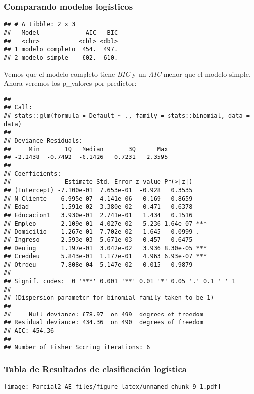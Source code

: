 \documentclass[
]{article}
\begin{document}
\hypertarget{comparando-modelos-loguxedsticos}{%
\subsubsection{Comparando modelos
logísticos}\label{comparando-modelos-loguxedsticos}}

\begin{verbatim}
## # A tibble: 2 x 3
##   Model             AIC   BIC
##   <chr>           <dbl> <dbl>
## 1 modelo completo  454.  497.
## 2 modelo simple    602.  610.
\end{verbatim}

Vemos que el modelo completo tiene \emph{BIC} y un \emph{AIC} menor que
el modelo simple. Ahora veremos los p\_valores por predictor:

\begin{verbatim}
## 
## Call:
## stats::glm(formula = Default ~ ., family = stats::binomial, data = data)
## 
## Deviance Residuals: 
##     Min       1Q   Median       3Q      Max  
## -2.2438  -0.7492  -0.1426   0.7231   2.3595  
## 
## Coefficients:
##               Estimate Std. Error z value Pr(>|z|)    
## (Intercept) -7.100e-01  7.653e-01  -0.928   0.3535    
## N_Cliente   -6.995e-07  4.141e-06  -0.169   0.8659    
## Edad        -1.591e-02  3.380e-02  -0.471   0.6378    
## Educacion1   3.930e-01  2.741e-01   1.434   0.1516    
## Empleo      -2.109e-01  4.027e-02  -5.236 1.64e-07 ***
## Domicilio   -1.267e-01  7.702e-02  -1.645   0.0999 .  
## Ingreso      2.593e-03  5.671e-03   0.457   0.6475    
## Deuing       1.197e-01  3.042e-02   3.936 8.30e-05 ***
## Creddeu      5.843e-01  1.177e-01   4.963 6.93e-07 ***
## Otrdeu       7.808e-04  5.147e-02   0.015   0.9879    
## ---
## Signif. codes:  0 '***' 0.001 '**' 0.01 '*' 0.05 '.' 0.1 ' ' 1
## 
## (Dispersion parameter for binomial family taken to be 1)
## 
##     Null deviance: 678.97  on 499  degrees of freedom
## Residual deviance: 434.36  on 490  degrees of freedom
## AIC: 454.36
## 
## Number of Fisher Scoring iterations: 6
\end{verbatim}

\hypertarget{tabla-de-resultados-de-clasificaciuxf3n-loguxedstica}{%
\subsubsection{Tabla de Resultados de clasificación
logística}\label{tabla-de-resultados-de-clasificaciuxf3n-loguxedstica}}

\texttt{[image: Parcial2\_AE\_files/figure-latex/unnamed-chunk-9-1.pdf]}
\end{document}
